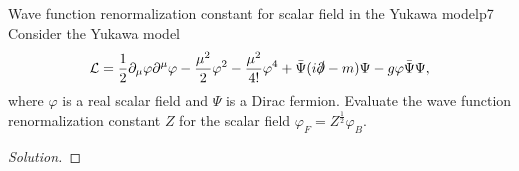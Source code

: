 \begin{problem}{Wave function renormalization constant for scalar field in the Yukawa model}{p7}
   Consider the Yukawa model
   \begin{equation*}
      \mathcal{L} = \frac12 \partial_\mu\varphi \partial^\mu \varphi - \frac{\mu^2}{2} \varphi^2 - \frac{\mu^2}{4!} \varphi^4 + \bar{\Psi} (i \slashed{\partial} - m) \Psi - g \varphi \bar{\Psi}\Psi,
   \end{equation*}
   where \(\varphi\) is a real scalar field and \(\Psi\) is a Dirac fermion. Evaluate the wave function renormalization constant \(Z\) for the scalar field \(\varphi_F = Z^{\frac12} \varphi_B.\)
\end{problem}
\begin{proof}[Solution]
    
\end{proof}
